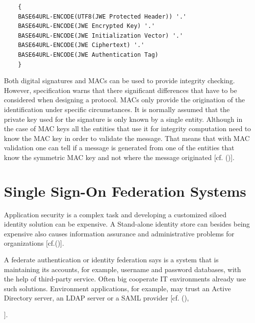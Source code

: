 {	
	\begin{lstlisting}
	{
	BASE64URL-ENCODE(UTF8(JWE Protected Header)) '.'
	BASE64URL-ENCODE(JWE Encrypted Key) '.'
	BASE64URL-ENCODE(JWE Initialization Vector) '.'
	BASE64URL-ENCODE(JWE Ciphertext) '.'
	BASE64URL-ENCODE(JWE Authentication Tag)
	}
	\end{lstlisting}
	
	Both digital signatures and MACs can be used to provide integrity checking. However, specification warns that there significant differences that have to be considered when designing a protocol. MACs only provide the origination of the identification under specific circumstances. It is normally assumed that the private key used for the signature is only known by a single entity. Although in the case of MAC keys all the entities that use it for integrity computation need to know the MAC key in order to validate the message. That means that with MAC validation one can tell if a message is generated from one of the entities that know the symmetric MAC key and not where the message originated [cf. (\cite{JWT:IETF:Jones:2015})].	
	
\section{Single Sign-On Federation Systems}

Application security is a complex task and developing a customized siloed identity solution can be expensive. A Stand-alone identity store can besides being expensive also causes information assurance and administrative problems for organizations  [cf.(\cite{JerichoSystems:IS})]. 

A federate authentication or identity federation says \cite{Boyed:2012:GSOA} is a system that is maintaining its accounts, for example, username and password databases, with the help of third-party service. Often big cooperate IT environments already use such solutions. Environment applications, for example, may trust an Active Directory server, an LDAP server or a SAML provider [cf. (\cite{Birell:2013:FIMS}), {\cite{Boyed:2012:GSOA}].
	
}}
